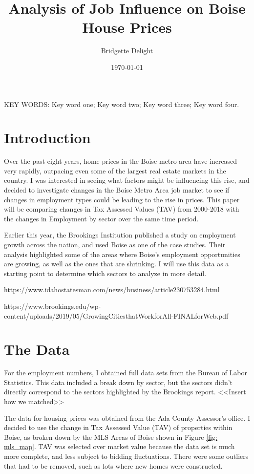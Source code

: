 \documentclass{article}
\title{\textbf{Analysis of Job Influence on Boise House Prices}}
\author{\vspace{11pt}Bridgette Delight}
\affil[1]{Department of Mathematics, Boise State University, Boise, Idaho 83725}
\affil[2]{Department of Computer Science, Boise State University, Boise, Idaho 83725}
\date{\today}
\begin{document}

\maketitle

\begin{abstract}

\end{abstract}

\vspace{8pt}
\noindent
KEY WORDS: Key word one; Key word two; Key word three; Key word four.

\section{Introduction}
Over the past eight years, home prices in the Boise metro area have increased very rapidly, outpacing even some of the largest real estate markets in the country. I was interested in seeing what factors might be influencing this rise, and decided to investigate changes in the Boise Metro Area job market to see if changes in employment types could be leading to the rise in prices. This paper will be comparing changes in Tax Assessed Values (TAV) from 2000-2018 with the changes in Employment by sector over the same time period. 

Earlier this year, the Brookings Institution published a study on employment growth across the nation, and used Boise as one of the case studies. Their analysis highlighted some of the areas where Boise's employment opportunities are growing, as well as the ones that are shrinking. I will use this data as a starting point to determine which sectors to analyze in more detail.

https://www.idahostatesman.com/news/business/article230753284.html

https://www.brookings.edu/wp-content/uploads/2019/05/GrowingCitiesthatWorkforAll-FINALforWeb.pdf

\section{The Data}
For the employment numbers, I obtained full data sets from the Bureau of Labor Statistics. This data included a break down by sector, but the sectors didn't directly correspond to the sectors highlighted by the Brookings report. <<Insert how we matched>>

The data for housing prices was obtained from the Ada County Assessor's office. I decided to use the change in Tax Assessed Value (TAV) of properties within Boise, as broken down by the MLS Areas of Boise shown in Figure \ref{fig: mls_map}. TAV was selected over market value because the data set is much more complete, and less subject to bidding fluctuations. There were some outliers that had to be removed, such as lots where new homes were constructed.  
\end{document}
